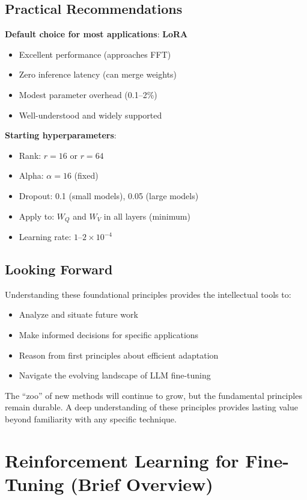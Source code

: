 \documentclass{article}
\begin{document}
\subsection{Practical Recommendations}

\textbf{Default choice for most applications}: \textbf{LoRA}
\begin{itemize}
\item Excellent performance (approaches FFT)
\item Zero inference latency (can merge weights)
\item Modest parameter overhead (0.1--2\%)
\item Well-understood and widely supported
\end{itemize}

\textbf{Starting hyperparameters}:
\begin{itemize}
\item Rank: $r = 16$ or $r = 64$
\item Alpha: $\alpha = 16$ (fixed)
\item Dropout: 0.1 (small models), 0.05 (large models)
\item Apply to: $W_Q$ and $W_V$ in all layers (minimum)
\item Learning rate: $1$--$2 \times 10^{-4}$
\end{itemize}

\subsection{Looking Forward}

Understanding these foundational principles provides the intellectual tools to:
\begin{itemize}
\item Analyze and situate future work
\item Make informed decisions for specific applications
\item Reason from first principles about efficient adaptation
\item Navigate the evolving landscape of LLM fine-tuning
\end{itemize}

The ``zoo'' of new methods will continue to grow, but the fundamental principles remain durable. A deep understanding of these principles provides lasting value beyond familiarity with any specific technique.



\section{Reinforcement Learning for Fine-Tuning (Brief Overview)}
\end{document}
